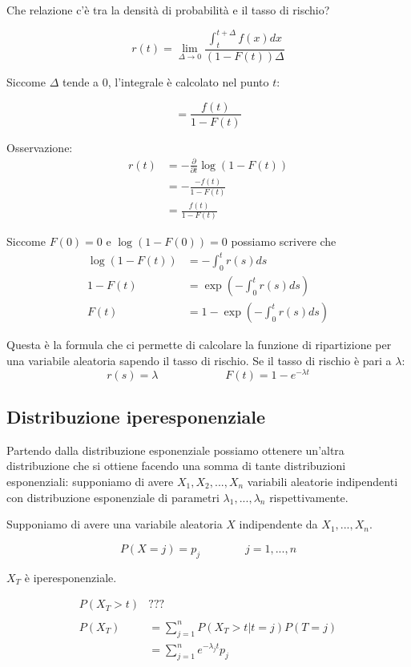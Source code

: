 \documentclass[a4paper,12pt]{book}
\begin{document}
Che relazione c'è tra la densità di probabilità e il tasso di rischio?

$$ r(t) = \lim\limits_{\Delta \to 0} \frac{\int_{t}^{t + \Delta} f(x)dx }{(1 - F(t))\Delta}$$ 

Siccome $\Delta$ tende a 0, l'integrale è calcolato nel punto $ t $:

$$ = \frac{f(t)}{1 - F(t)} $$

Osservazione:
\begin{align*}
	r(t) & = -\frac{\partial}{\partial t} \log (1 - F(t)) \\
	& = - \frac{-f(t)}{1 - F(t)} \\
	& = \frac{f(t)}{1 - F(t)}
\end{align*}

Siccome $ F(0) = 0 $ e $ \log(1 - F(0)) = 0 $ possiamo scrivere che 
\begin{align*}
	\log(1 - F(t)) & = -\int_{0}^{t} r(s) ds \\
	1 - F(t) & = \exp \left( - \int_{0}^{t} r(s)ds \right) \\
	F(t) & = 1 - \exp \left( - \int_{0}^{t} r(s)ds \right)
\end{align*}

Questa è la formula che ci permette di calcolare la funzione di ripartizione per una variabile aleatoria sapendo il tasso di rischio. Se il tasso di rischio è pari a $\lambda$:
$$ r(s) = \lambda \qquad \qquad \qquad F(t) = 1 - e^{-\lambda t}$$ 

\subsection{Distribuzione iperesponenziale}

Partendo dalla distribuzione esponenziale possiamo ottenere un'altra distribuzione che si ottiene facendo una somma di tante distribuzioni esponenziali: supponiamo di avere $ X_1, X_2, ..., X_n $ variabili aleatorie indipendenti con distribuzione esponenziale di parametri $ \lambda_1, ..., \lambda_n $ rispettivamente. 

Supponiamo di avere una variabile aleatoria $ X $ indipendente da $ X_1, ..., X_n $.

$$ P(X = j) = p_j \qquad \qquad j = 1, ..., n $$

$ X_T $ è iperesponenziale.

\begin{align*}
	P(X_T > t) & ??? \\ %
	\\
	P(X_T) & = \sum_{j=1}^{n} P(X_T > t | t = j) P (T = j) \\
	& = \sum_{j = 1}^{n} e ^{-\lambda_j t} p_j
\end{align*}
\end{document}
